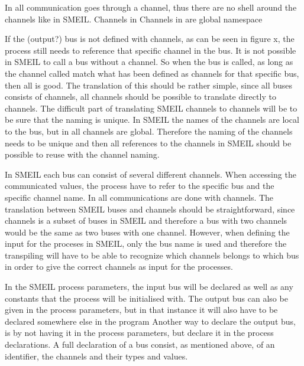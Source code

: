 In \cspm all communication goes through a channel, thus there are no shell around the channels like in SMEIL.
Channels in \cspm %
Channels in \cspm are global namespace %




If the (output?) bus is not defined with channels, as can be seen in figure x,
the process still needs to reference that specific channel in the bus. It is not possible in SMEIL to call a bus without a channel. So when the bus is called, as long as the channel called match what has been defined as channels for that specific bus, then all is good. The translation of this should be rather simple, since all buses consists of channels, all channels should be possible to translate directly to \cspm channels.
The difficult part of translating SMEIL channels to \cspm channels will be to be sure that the naming is unique. In SMEIL the names of the channels are local to the bus, but in \cspm all channels are global. Therefore the naming of the channels needs to be unique and then all references to the channels in SMEIL should be possible to reuse with the \cspm channel naming.


In SMEIL each bus can consist of several different channels. When accessing the communicated values, the process have to refer to the specific bus and the specific channel name. In \cspm all communications are done with channels. The translation between SMEIL buses and \cspm channels should be straightforward, since channels is a subset of buses in SMEIL and therefore a bus with two channels would be the same as two buses with one channel. However, when defining the input for the proceses in SMEIL, only the bus name is used and therefore the transpiling will have to be able to recognize which channels belongs to which bus in order to give the correct channels as input for the \cspm processes.



In the SMEIL process parameters, the input bus will be declared as well as any constants that the process will be initialised with. The output bus can also be given in the process parameters, but in that instance it will also have to be declared somewhere else in the program
Another way to declare the output bus, is by not having it in the process parameters, but declare it in the process declarations.
A full declaration of a bus consist, as mentioned above, of an identifier, the channels and their types and values.

